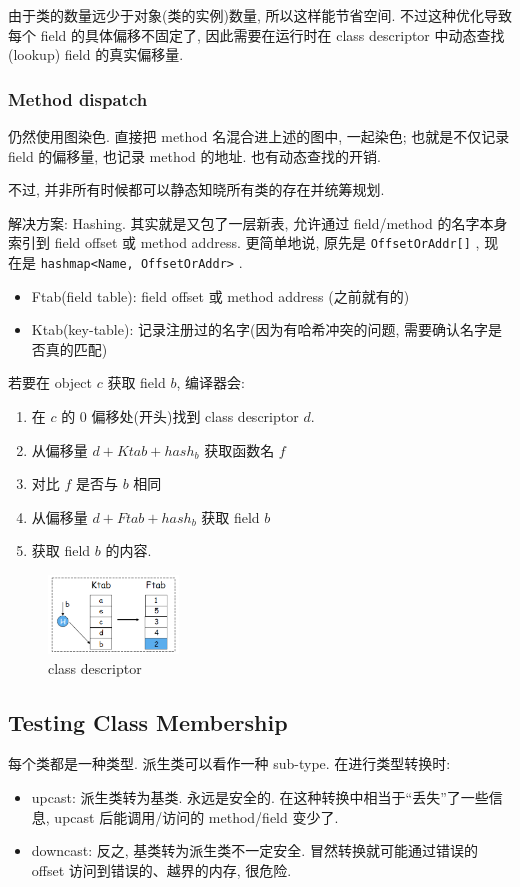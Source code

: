 由于类的数量远少于对象(类的实例)数量, 所以这样能节省空间. 不过这种优化导致每个 field 的具体偏移不固定了, 因此需要在运行时在 class descriptor 中动态查找(lookup) field 的真实偏移量.

\subsubsection{Method dispatch}
仍然使用图染色. 直接把 method 名混合进上述的图中, 一起染色; 也就是不仅记录 field 的偏移量, 也记录 method 的地址. 也有动态查找的开销. 

不过, 并非所有时候都可以静态知晓所有类的存在并统筹规划. 

解决方案: Hashing. 其实就是又包了一层新表, 允许通过 field/method 的名字本身索引到 field offset 或 method address. 更简单地说, 原先是 \texttt{OffsetOrAddr[]} , 现在是 \texttt{hashmap<Name, OffsetOrAddr>} .

\begin{itemize}
    \item Ftab(field table): field offset 或 method address (之前就有的)
    \item Ktab(key-table): 记录注册过的名字(因为有哈希冲突的问题, 需要确认名字是否真的匹配)
\end{itemize}

若要在 object $c$ 获取 field $b$, 编译器会:
\begin{enumerate}
    \item 在 $c$ 的 0 偏移处(开头)找到 class descriptor $d$.
    \item 从偏移量 $d+Ktab+hash_b$ 获取函数名 $f$
    \item 对比 $f$ 是否与 $b$ 相同
    \item 从偏移量 $d+Ftab+hash_b$ 获取 field $b$
    \item 获取 field $b$ 的内容. 
\end{enumerate}

\begin{figure}[!htb]
    \centering
    \includegraphics[width=0.309\textwidth]{pic/CP14/class descriptor}
    \caption{class descriptor}
\end{figure}


\subsection{Testing Class Membership}
每个类都是一种类型. 派生类可以看作一种 sub-type. 在进行类型转换时: 
\begin{itemize}
    \item upcast: 派生类转为基类. 永远是安全的.  在这种转换中相当于“丢失”了一些信息, upcast 后能调用/访问的 method/field 变少了. 
    \item downcast: 反之, 基类转为派生类不一定安全. 冒然转换就可能通过错误的 offset 访问到错误的、越界的内存, 很危险. 
\end{itemize}

